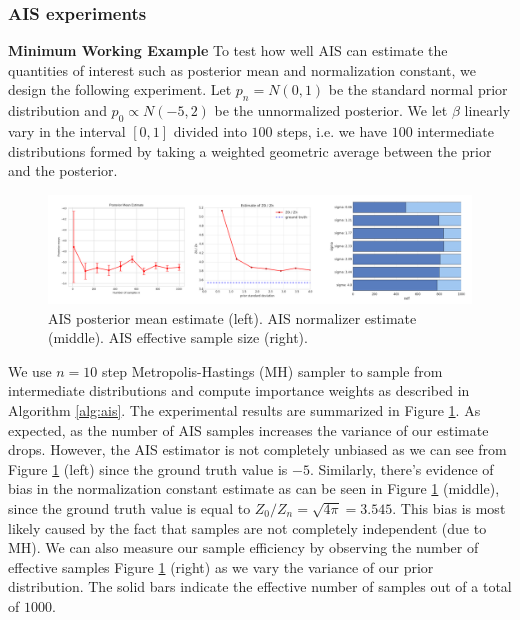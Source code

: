 \subsubsection{AIS experiments}

\textbf{Minimum Working Example}
To test how well AIS can estimate the quantities of interest such as posterior mean and normalization constant, we design the following experiment. Let $p_n = N(0, 1)$ be the standard normal prior distribution and $p_0 \propto N(-5, 2)$ be the unnormalized posterior. We let $\beta$ linearly vary in the interval $[0, 1]$ divided into $100$ steps, i.e. we have $100$ intermediate distributions formed by taking a weighted geometric average between the prior and the posterior.

\begin{figure}[tbhp]
    \centering
    \includegraphics[width=\textwidth, trim={10 10 10 10}]{figures/ais_exp1.png}
    \caption{AIS posterior mean estimate (left). AIS normalizer estimate (middle). AIS effective sample size (right).}
    \label{fig:ais_exp1}
\end{figure}

We use $n=10$ step Metropolis-Hastings (MH) sampler to sample from intermediate distributions and compute importance weights as described in Algorithm \ref{alg:ais}. The experimental results are summarized in Figure \ref{fig:ais_exp1}. As expected, as the number of AIS samples increases the variance of our estimate drops. However, the AIS estimator is not completely unbiased as we can see from Figure \ref{fig:ais_exp1} (left) since the ground truth value is $-5$. Similarly, there's evidence of bias in the normalization constant estimate as can be seen in Figure \ref{fig:ais_exp1} (middle), since the ground truth value is equal to $Z_0/Z_n = \sqrt{4\pi} = 3.545$. This bias is most likely caused by the fact that samples are not completely independent (due to MH). We can also measure our sample efficiency by observing the number of effective samples Figure \ref{fig:ais_exp1} (right) as we vary the variance of our prior distribution. The solid bars indicate the effective number of samples out of a total of $1000$.  






